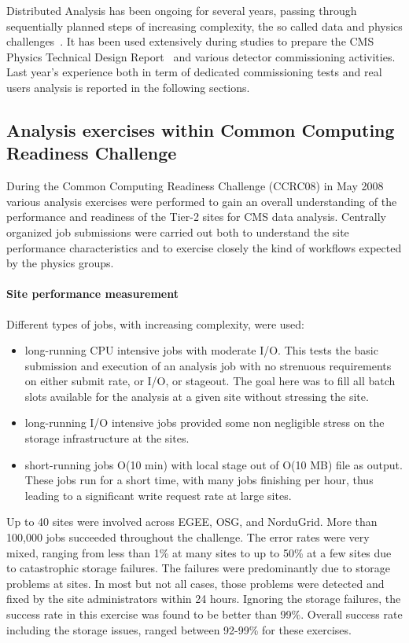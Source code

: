 Distributed Analysis has been ongoing for several years, passing through sequentially planned steps of 
increasing complexity, the so called data and physics challenges~\cite{RefPastExp}. 
It has been used extensively during studies to prepare the CMS Physics Technical Design Report~\cite{PTDR} and various detector commissioning activities. 
Last year's experience both in term of dedicated commissioning tests and real users analysis is reported in the following sections.

\subsection{Analysis exercises within Common Computing Readiness Challenge}
\label{sec:5_1}
During the Common Computing Readiness Challenge (CCRC08) in May 2008
various analysis exercises were performed to gain an overall understanding 
of the performance and readiness of the Tier-2 sites for CMS data analysis.
Centrally organized job submissions were carried out both to understand the site performance characteristics and to exercise closely the kind of workflows
expected by the physics groups.
\paragraph{Site performance measurement}
Different types of jobs, with increasing complexity, were used:
\begin{itemize}
\item long-running CPU intensive jobs with moderate I/O. This tests the basic submission and execution of an analysis job with no strenuous requirements on 
either submit rate, or I/O, or stageout. The goal here was to fill all batch slots available for the analysis at a given site without stressing the site.
\item long-running I/O intensive jobs provided some non negligible stress on 
the storage infrastructure at the sites.
\item short-running jobs O(10 min) with local stage out of O(10 MB) file as output. These jobs run for a short time, with many jobs finishing per hour, thus leading to a significant write request rate at large sites.
\end{itemize}
Up to 40 sites were involved across EGEE, OSG, and NorduGrid. More than 100,000 jobs succeeded throughout the challenge. The error rates were very mixed, ranging from less than 1\% at many sites to up to 50\% at a few sites due to
catastrophic storage failures. The failures were predominantly
due to storage problems at sites. In most but not all cases, those problems were detected and fixed by the site administrators within 24 hours. Ignoring the storage failures, the success rate in this exercise was found to be better than 99\%. Overall success rate including the storage issues, ranged between 92-99\% for these exercises.

